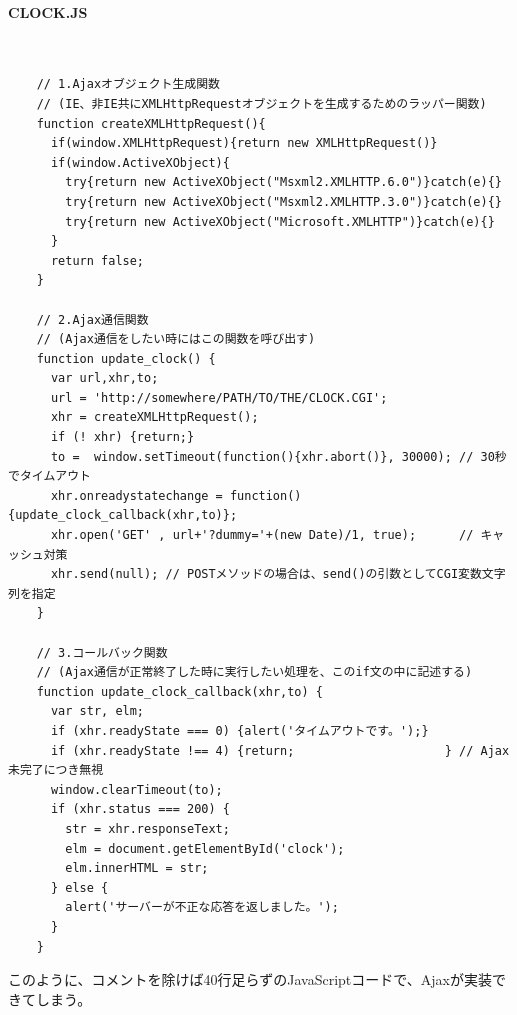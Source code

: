 \paragraph{CLOCK.JS} 　\\
\begin{frameboxit}{160.0mm}
\begin{verbatim}
	// 1.Ajaxオブジェクト生成関数
	// (IE、非IE共にXMLHttpRequestオブジェクトを生成するためのラッパー関数)
	function createXMLHttpRequest(){
	  if(window.XMLHttpRequest){return new XMLHttpRequest()}
	  if(window.ActiveXObject){
	    try{return new ActiveXObject("Msxml2.XMLHTTP.6.0")}catch(e){}
	    try{return new ActiveXObject("Msxml2.XMLHTTP.3.0")}catch(e){}
	    try{return new ActiveXObject("Microsoft.XMLHTTP")}catch(e){}
	  }
	  return false;
	}

	// 2.Ajax通信関数
	// (Ajax通信をしたい時にはこの関数を呼び出す)
	function update_clock() {
	  var url,xhr,to;
	  url = 'http://somewhere/PATH/TO/THE/CLOCK.CGI';
	  xhr = createXMLHttpRequest();
	  if (! xhr) {return;}
	  to =  window.setTimeout(function(){xhr.abort()}, 30000); // 30秒でタイムアウト
	  xhr.onreadystatechange = function(){update_clock_callback(xhr,to)};
	  xhr.open('GET' , url+'?dummy='+(new Date)/1, true);      // キャッシュ対策
	  xhr.send(null); // POSTメソッドの場合は、send()の引数としてCGI変数文字列を指定
	}

	// 3.コールバック関数
	// (Ajax通信が正常終了した時に実行したい処理を、このif文の中に記述する)
	function update_clock_callback(xhr,to) {
	  var str, elm;
	  if (xhr.readyState === 0) {alert('タイムアウトです。');}
	  if (xhr.readyState !== 4) {return;                     } // Ajax未完了につき無視
	  window.clearTimeout(to);
	  if (xhr.status === 200) {
	    str = xhr.responseText;
	    elm = document.getElementById('clock');
	    elm.innerHTML = str;
	  } else {
	    alert('サーバーが不正な応答を返しました。');
	  }
	}
\end{verbatim}
\end{frameboxit}
このように、コメントを除けば40行足らずのJavaScriptコードで、Ajaxが実装できてしまう。

